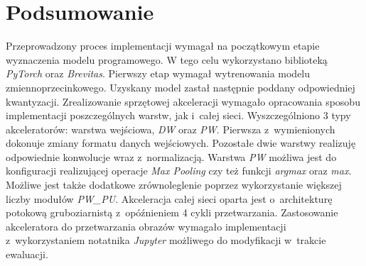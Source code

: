 \section{Podsumowanie}
Przeprowadzony proces implementacji wymagał na początkowym etapie wyznaczenia modelu programowego. 
W tego celu wykorzystano biblioteką \emph{PyTorch} oraz \emph{Brevitas}.
Pierwszy etap wymagał wytrenowania modelu zmiennoprzecinkowego.
Uzyskany model zastał następnie poddany odpowiedniej kwantyzacji.
Zrealizowanie sprzętowej akceleracji wymagało opracowania sposobu implementacji poszczególnych warstw, jak i~całej sieci.
Wyszczególniono 3 typy akceleratorów: warstwa wejściowa,  \emph{DW} oraz \emph{PW}.
Pierwsza z~wymienionych dokonuje zmiany formatu danych wejściowych.
Pozostałe dwie warstwy realizuję odpowiednie konwolucje wraz z~normalizacją.
Warstwa \emph{PW} możliwa jest do konfiguracji realizującej operacje \emph{Max Pooling} czy też funkcji \emph{argmax} oraz \emph{max}. 
Możliwe jest także dodatkowe zrównoleglenie poprzez wykorzystanie większej liczby modułów \emph{PW\_PU}. 
Akceleracja całej sieci oparta jest o~architekturę potokową gruboziarnistą z~opóźnieniem 4 cykli przetwarzania.
Zastosowanie akceleratora do przetwarzania obrazów wymagało implementacji z~wykorzystaniem notatnika \emph{Jupyter} możliwego do modyfikacji w~trakcie ewaluacji. 












